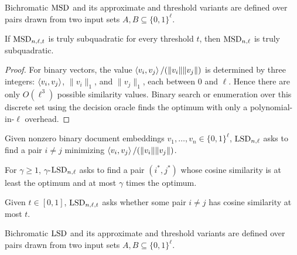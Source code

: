 \begin{definition}
  \label{def:bichromatic-msd}
  Bichromatic $\mathrm{MSD}$ and its approximate and threshold variants are defined over
  pairs drawn from two input sets $A,B\subseteq\{0,1\}^{\ell}$.
\end{definition}

\begin{lemma}
  \label{lem:msd-decision-search}
  If $\mathrm{MSD}_{n,\ell,t}$ is truly subquadratic for every threshold $t$, then
  $\mathrm{MSD}_{n,\ell}$ is truly subquadratic.
\end{lemma}
\begin{proof}
  For binary vectors, the value $\left\langle v_i,v_j\right\rangle/(\|v_i\|\|v_j\|)$ is determined by
  three integers: $\left\langle v_i,v_j\right\rangle$, $\|v_i\|_1$, and $\|v_j\|_1$, each between
  $0$ and $\ell$.  Hence there are only $O(\ell^3)$ possible similarity values.
  Binary search or enumeration over this discrete set using the decision oracle
  finds the optimum with only a polynomial-in-$\ell$ overhead.
\end{proof}

\begin{definition}
  \label{def:lsd}
  Given nonzero binary document embeddings $v_1,\ldots,v_n\in\{0,1\}^{\ell}$,
  $\mathrm{LSD}_{n,\ell}$ asks to find a pair $i\neq j$ minimizing
  $\left\langle v_i,v_j\right\rangle/(\|v_i\|\|v_j\|)$.
\end{definition}

\begin{definition}
  \label{def:gamma-lsd}
  For $\gamma\geq 1$, $\gamma$-$\mathrm{LSD}_{n,\ell}$ asks to find a pair
  $(i^*,j^*)$ whose cosine similarity is at least the optimum and at most
  $\gamma$ times the optimum.
\end{definition}

\begin{definition}
  \label{def:lsd-decision}
  Given $t\in[0,1]$, $\mathrm{LSD}_{n,\ell,t}$ asks whether some pair $i\neq j$ has
  cosine similarity at most $t$.
\end{definition}

\begin{definition}
  \label{def:bichromatic-lsd}
  Bichromatic $\mathrm{LSD}$ and its approximate and threshold variants are defined over
  pairs drawn from two input sets $A,B\subseteq\{0,1\}^{\ell}$.
\end{definition}


